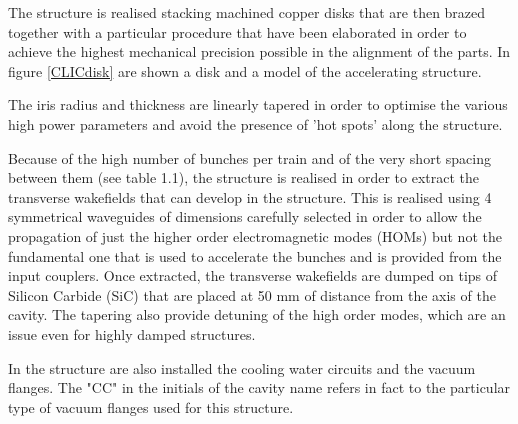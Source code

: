 The structure is realised stacking machined copper disks that are then brazed together with a particular procedure that have been elaborated in order to achieve the highest mechanical precision possible in the alignment of the parts. In figure \ref{CLICdisk} are shown a disk and a model of the accelerating structure.

The iris radius and thickness are linearly tapered in order to optimise the various high power parameters and avoid the presence of 'hot spots' along the structure. 

Because of the high number of bunches per train and of the very short spacing between them (see table 1.1), the structure is realised in order to extract the transverse wakefields that can develop in the structure. This is realised using 4 symmetrical waveguides of dimensions carefully selected in order to allow the propagation of just the higher order electromagnetic modes (HOMs) but not the fundamental one that is used to accelerate the bunches and is provided from the input couplers. Once extracted, the transverse wakefields are dumped on tips of Silicon Carbide (SiC) that are placed at 50 mm of distance from the axis of the cavity.
The tapering also provide detuning of the high order modes, which are an issue even for highly damped structures.

In the structure are also installed the cooling water circuits and the vacuum flanges. The "CC" in the initials of the cavity name refers in fact to the particular type of vacuum flanges used for this structure.



